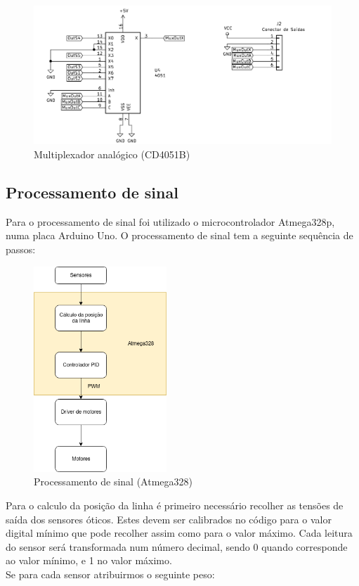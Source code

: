 \documentclass[]{report}
\begin{document}
\begin{figure}[!htb]
	\centering
	\includegraphics[width=14cm]{imagens/mux}
	\caption{Multiplexador analógico (CD4051B)}
\end{figure}

\pagebreak

\subsection*{Processamento de sinal}
Para o processamento de sinal foi utilizado o microcontrolador Atmega328p, numa placa Arduino Uno.
O processamento de sinal tem a seguinte sequência de passos:


\begin{figure}[!htb]
	\centering
	\includegraphics[width=5cm]{imagens/atmega_flow}
	\caption{Processamento de sinal (Atmega328)}
\end{figure}

Para o calculo da posição da linha é primeiro necessário recolher as tensões de saída dos sensores óticos. Estes devem ser calibrados no código para o valor digital mínimo que pode recolher assim como para o valor máximo. Cada leitura do sensor será transformada num número decimal, sendo 0 quando corresponde ao valor mínimo, e 1 no valor máximo. \\
Se para cada sensor atribuirmos o seguinte peso:
\end{document}
